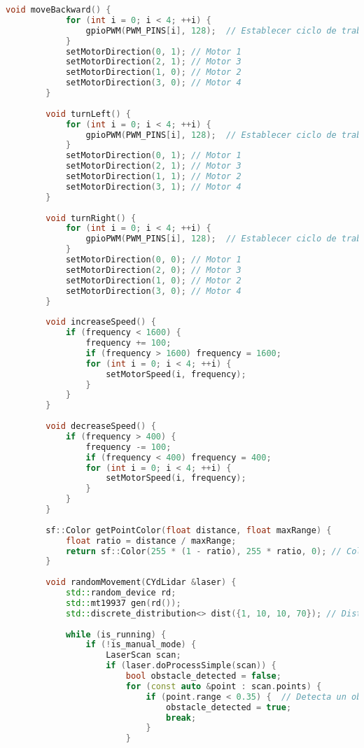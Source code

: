 \begin{lstlisting}[language={C++}, caption={Primera versi\'on del c\'odigo del sistema de control del robot}, label={Script}]
        void moveBackward() {
            for (int i = 0; i < 4; ++i) {
                gpioPWM(PWM_PINS[i], 128);  // Establecer ciclo de trabajo al 50%
            }
            setMotorDirection(0, 1); // Motor 1
            setMotorDirection(2, 1); // Motor 3
            setMotorDirection(1, 0); // Motor 2
            setMotorDirection(3, 0); // Motor 4
        }
        
        void turnLeft() {
            for (int i = 0; i < 4; ++i) {
                gpioPWM(PWM_PINS[i], 128);  // Establecer ciclo de trabajo al 50%
            }
            setMotorDirection(0, 1); // Motor 1
            setMotorDirection(2, 1); // Motor 3
            setMotorDirection(1, 1); // Motor 2
            setMotorDirection(3, 1); // Motor 4
        }
        
        void turnRight() {
            for (int i = 0; i < 4; ++i) {
                gpioPWM(PWM_PINS[i], 128);  // Establecer ciclo de trabajo al 50%
            }
            setMotorDirection(0, 0); // Motor 1
            setMotorDirection(2, 0); // Motor 3
            setMotorDirection(1, 0); // Motor 2
            setMotorDirection(3, 0); // Motor 4
        }
        
        void increaseSpeed() {
            if (frequency < 1600) {
                frequency += 100;
                if (frequency > 1600) frequency = 1600;
                for (int i = 0; i < 4; ++i) {
                    setMotorSpeed(i, frequency);
                }
            }
        }
        
        void decreaseSpeed() {
            if (frequency > 400) {
                frequency -= 100;
                if (frequency < 400) frequency = 400;
                for (int i = 0; i < 4; ++i) {
                    setMotorSpeed(i, frequency);
                }
            }
        }
        
        sf::Color getPointColor(float distance, float maxRange) {
            float ratio = distance / maxRange;
            return sf::Color(255 * (1 - ratio), 255 * ratio, 0); // Color de rojo a verde
        }
        
        void randomMovement(CYdLidar &laser) {
            std::random_device rd;
            std::mt19937 gen(rd());
            std::discrete_distribution<> dist({1, 10, 10, 70}); // Distribuci\'on para la probabilidad de movimiento
        
            while (is_running) {
                if (!is_manual_mode) {
                    LaserScan scan;
                    if (laser.doProcessSimple(scan)) {
                        bool obstacle_detected = false;
                        for (const auto &point : scan.points) {
                            if (point.range < 0.35) {  // Detecta un obst\'aculo a 35 cm
                                obstacle_detected = true;
                                break;
                            }
                        }
        

\end{lstlisting}
